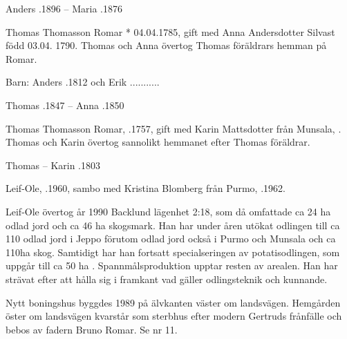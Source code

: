 Anders .1896  --  Maria .1876


Thomas Thomasson Romar * 04.04.1785, gift med Anna Andersdotter Silvast född 03.04. 1790.
Thomas och Anna övertog Thomas föräldrars hemman på Romar.
\begin{jhchildren}
  \item {}
  \item {}
\end{jhchildren}

Barn:  Anders  .1812 och Erik \textborn ...........

Thomas .1847  --  Anna .1850


Thomas Thomasson Romar, .1757,  gift med Karin Mattsdotter från Munsala, . Thomas och Karin övertog sannolikt hemmanet efter Thomas föräldrar.
\begin{jhchildren}
  \item {}
\end{jhchildren}

Thomas   --  Karin .1803






Leif-Ole, .1960, sambo med Kristina Blomberg från Purmo, .1962.

\begin{jhchildren}
  \item {}
  \item {}
\end{jhchildren}
Leif-Ole övertog år 1990 Backlund lägenhet 2:18, som då omfattade ca 24 ha odlad jord och ca 46 ha skogsmark. Han har under åren utökat odlingen till ca 110 odlad jord i Jeppo förutom odlad jord också i Purmo och Munsala och ca 110ha skog. Samtidigt har han fortsatt specialseringen av potatisodlingen, som uppgår till ca 50 ha . Spannmålsproduktion upptar resten av arealen. Han har strävat efter att hålla sig i framkant vad gäller odlingsteknik och kunnande.

Nytt boningshus byggdes 1989 på älvkanten väster om landsvägen. Hemgården öster om landsvägen kvarstår som sterbhus efter modern Gertruds frånfälle och bebos av fadern Bruno Romar. Se nr 11.

